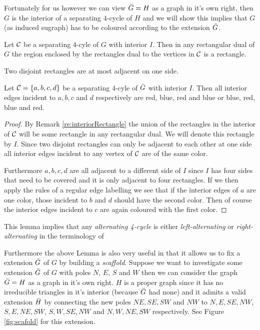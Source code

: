 Fortunately for us however we can view $\bar{G} = H$ as a graph in it's own right, then $G$ is the interior of a separating $4$-cycle of $H$ and we will show this implies that $G$ (as induced sugraph) has to be coloured according to the extension $\bar{G}$.

\begin{remark}
\label{re:interiorRectangle}
Let $\mathcal{C}$ be a separating $4$-cyle of $G$ with interior $I$. Then in any rectangular dual of $G$ the region enclosed by the rectangles dual to the vertices in $\mathcal{C}$ is a rectangle.
\end{remark}

\begin{remark}
\label{re:disjointRectanglesOnlyHaveOneAdjecentSide}
Two disjoint rectangles are at most adjacent on one side.
\end{remark}

\begin{lemma}
\label{lem:fourCycleUnicolor}
Let $\mathcal{C} = \left\lbrace {a, b, c, d} \right\rbrace$ be a separating $4$-cyle of $\bar{G}$ with interior $I$. Then all interior edges incident to $a, b, c$ and $d$ respectively are red, blue, red and blue or blue, red, blue and red.
\end{lemma}

\begin{proof}
By Remark \ref{re:interiorRectangle} the union of the rectangles in the interior of $\mathcal{C}$ will be some rectangle in any rectangular dual. We will denote this rectangle by $I$. Since two disjoint rectangles can only be adjacent to each other at one side all interior edges incident to any vertex of $\mathcal{C}$ are of the same color.

Furthermore $a, b, c, d$ are all adjacent to a different side of $I$ since $I$ has four sides that need to be covered and it is only adjacent to four rectangles. If we then apply the rules of a regular edge labelling we see that if the interior edges of $a$ are one color, those incident to $b$ and $d$ should have the second color. Then of course the interior edges incident to $c$ are again coloured with the first color.

\end{proof}

This lemma implies that any \emph{alternating 4-cycle} %
is either \emph{left-alternating} or \emph{right-alternating} %
in the terminology of \Fusy

Furthermore the above Lemma is also very useful in that it allows us to fix a extension $\bar{G}$ of $G$ by building a \emph{scaffold}. Suppose we want to investigate some extension $\bar{G}$ of $G$ with poles $N$, $E$, $S$ and $W$ then we can consider the graph $\bar{G} = H$ as a graph in it's own right. $H$ is a proper graph since it has no irreducible triangles in it's interior (because $\bar{G}$ had none) and it admits a valid extension $\bar{H}$ by connecting the new poles $NE, SE, SW$ and $NW$ to $N, E, SE, NW$, $S, E, NE, SW$, $S, W, SE, NW$ and $N, W, NE, SW$ respectively. See Figure \ref{fig:scafold} for this extension.

